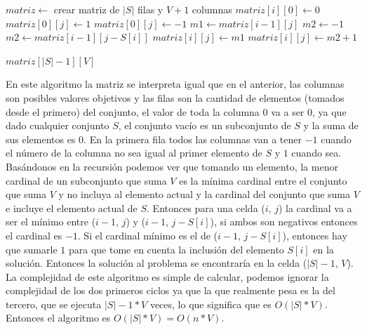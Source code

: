 \documentclass[a4paper]{article}
\begin{document}
\begin{algorithm}
\begin{algorithmic}
		\State $matriz \gets$ crear matriz de $|S|$ filas y $V+1$ columnas
			\State $matriz[i][0] \gets 0$
		\EndFor
				\State $matriz[0][j] \gets 1$
			\Else
				\State $matriz[0][j] \gets -1$
			\EndIf
		\EndFor
			\State $m1 \gets matriz[i-1][j]$			
				\State $m2 \gets -1$
			\Else
				\State $m2 \gets matriz[i-1][j - S[i]]$
			\EndIf
				\State $matriz[i][j] \gets m1$ 
			\Else
				\State $matriz[i][j] \gets m2 + 1$ 
			\EndIf
			\EndFor
		\EndFor
		
		\State \Return $matriz[|S|-1][V]$
	\EndProcedure
\end{algorithmic}
\end{algorithm}

En este algoritmo la matriz se interpreta igual que en el anterior, las columnas son posibles valores objetivos y las filas son la cantidad de elementos (tomados desde el primero) del conjunto, el valor de toda la columna $0$ va a ser $0$, ya que dado cualquier conjunto $S$, el conjunto vacío es un subconjunto de $S$ y la suma de sus elementos es $0$. En la primera fila todos las columnas van a tener $-1$ cuando el número de la columna no sea igual al primer elemento de $S$ y $1$ cuando sea. Basándonos en la recursión podemos ver que tomando un elemento, la menor cardinal de un subconjunto que suma $V$ es la mínima cardinal entre el conjunto que suma $V$ y no incluya al elemento actual y la cardinal del conjunto que suma $V$ e incluye el elemento actual de $S$. Entonces para una celda ($i$, $j$) la cardinal va a ser el mínimo entre ($i-1$, $j$) y
($i-1$, $j-S[i]$), si ambos son negativos entonces el cardinal es $-1$. Si el cardinal mínimo es el de ($i-1$, $j-S[i]$), entonces hay que sumarle $1$ para que tome en cuenta la inclusión del elemento $S[i]$ en la solución. Entonces la solución al problema se encontraría en la celda ($|S|-1$, $V$).
\\
La complejidad de este algoritmo es simple de calcular, podemos ignorar la complejidad de los dos primeros ciclos ya que la que realmente pesa es la del tercero, que se ejecuta $|S|-1 * V$ veces, lo que significa que es $O(|S|*V)$.
\\
Entonces el algoritmo es $O(|S|*V) = O(n*V)$.
\end{document}
